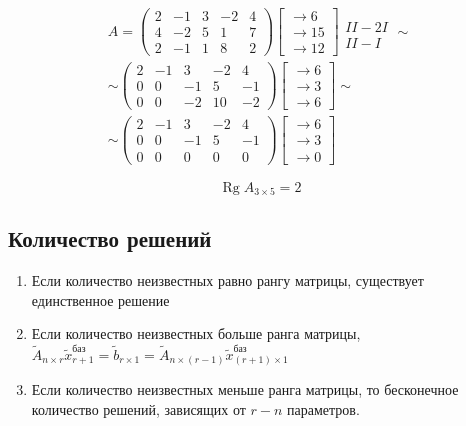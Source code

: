 \documentclass{article}
\DeclareMathOperator*{\Rg}{Rg}
\begin{document}
\begin{gather*}
	A = \begin{pmatrix}
		2 & -1 & 3 & -2 & 4 \\
		4 & -2 & 5 & 1 & 7 \\
		2 & -1 & 1 & 8 & 2
	\end{pmatrix}
	\begin{bmatrix}
		\to 6 \\
		\to 15 \\
		\to 12
	\end{bmatrix}
	\begin{matrix}
		\\ II - 2I \\ II - I
	\end{matrix} \sim \\
	\sim \begin{pmatrix}
		2 & -1 & 3 & -2 & 4 \\
		0 & 0 & -1 & 5 & -1 \\
		0 & 0 & -2 & 10 & -2
	\end{pmatrix}
	\begin{bmatrix}
		\to 6 \\
		\to 3 \\
		\to 6
	\end{bmatrix} \sim \\
	\sim \begin{pmatrix}
		2 & -1 & 3 & -2 & 4 \\
		0 & 0 & -1 & 5 & -1 \\
		0 & 0 & 0 & 0 & 0
	\end{pmatrix}
	\begin{bmatrix}
		\to 6 \\
		\to 3 \\
		\to 0
	\end{bmatrix}
\end{gather*}

\[
\Rg{A_{3 \times 5}} = 2
\]

\subsection{Количество решений}

\begin{enumerate}
	\item Если количество неизвестных равно рангу матрицы, существует \\
	единственное решение
	\item Если количество неизвестных больше ранга матрицы, $\tilde{A}_{n \times r} \tilde{x}_{r+1}^{\text{баз}} =
	\tilde{b}_{r \times 1} = \tilde{A}_{n \times (r - 1)} \tilde{x}_{(r + 1) \times 1}^{\text{баз}}$
	\item Если количество неизвестных меньше ранга матрицы, то бесконечное \\
	количество решений, зависящих от $r - n$ параметров.
\end{enumerate}
\end{document}
